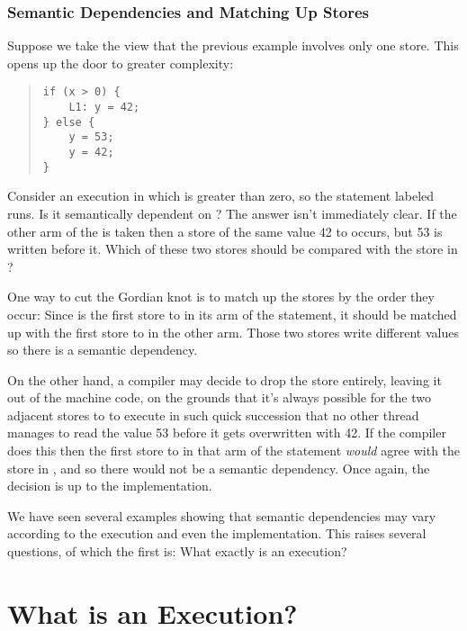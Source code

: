 \subsubsection{Semantic Dependencies and Matching Up Stores}
\label{sec:Semantic Dependencies and Matching Up Stores}

Suppose we take the view that the previous example involves only one
store.
This opens up the door to greater complexity:
\begin{quote}
\begin{verbatim}
if (x > 0) {
    L1: y = 42;
} else {
    y = 53;
    y = 42;
}
\end{verbatim}
\end{quote}
Consider an execution in which  is greater than zero, so the
statement labeled  runs.
Is it semantically dependent on ?
The answer isn't immediately clear.
If the other arm of the  is taken then a store of the same value 42 to
 occurs, but 53 is written before it.
Which of these two stores should be compared with the store in ?

One way to cut the Gordian knot is to match up the stores by the order
they occur:
Since  is the first store to  in its arm of the 
statement, it should be matched up with the first store to  in
the other arm.
Those two stores write different values so there is a semantic
dependency.

On the other hand, a compiler may decide to drop the  store entirely, leaving it out of the machine code,
on the grounds that it's always possible for the two adjacent stores
to  to execute in such quick succession that no other thread
manages to read the value 53 before it gets overwritten with 42.
If the compiler does this then the first store to  in that
arm of the  statement \emph{would} agree with the store in
, and so there would not be a semantic dependency.
Once again, the decision is up to the implementation.

We have seen several examples showing that semantic dependencies may vary
according to the execution and even the implementation.
This raises several questions, of which the first is:
What exactly is an execution?

\section{What is an Execution?}
\label{sec:What is an Execution?}


